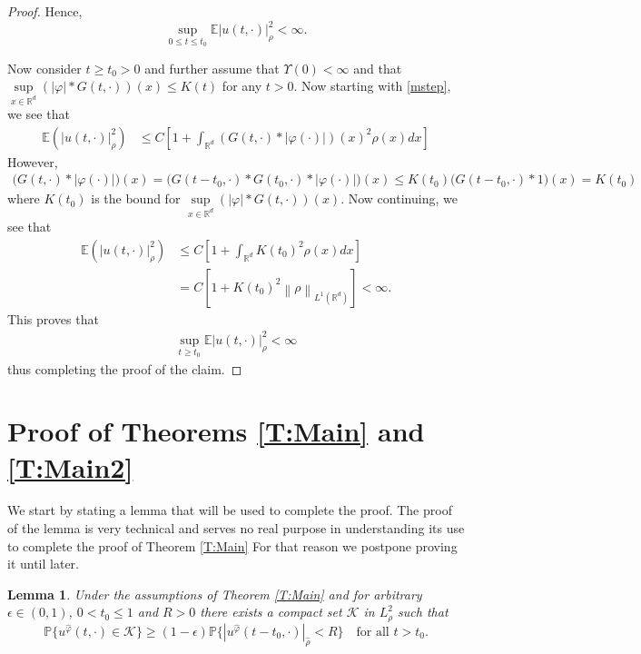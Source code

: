 \documentclass[a4paper,11pt]{article}%
\numberwithin{equation}{section}
\theoremstyle{plain}
\newtheorem{lemma}[theorem]{Lemma}
\theoremstyle{definition}
\newcommand{\R}{\mathbb{R}}
\newcommand{\E}{\mathbb{E}}
\newcommand{\Norm}[1]{\left\|  #1   \right\|}
\begin{document}
\begin{proof}
	Hence,
	\[
	\sup_{0 \le t \le t_0}\E |u(t,\cdot)|_\rho^2 < \infty.
	\]

	Now consider $t\ge t_0>0$ and further assume that $\Upsilon(0) < \infty$ and that $\sup\limits_{x\in \R^d}(|\varphi|*G(t,\cdot))(x) \le K(t)$ for any $t>0$. Now starting with \eqref{mstep}, we see that
	\begin{align*}
		\E\left(| u(t,\cdot)|_\rho^2\right)
		& \le  C\left[1+\int_{\R^d}(G(t,\cdot)*|\varphi(\cdot)|)(x)^2\rho(x)dx\right]
	\end{align*}
	However,
	\begin{align*}
		\big(G(t,\cdot)*|\varphi(\cdot)|\big)(x) = \big(G(t-t_0,\cdot)*G(t_0,\cdot)*|\varphi(\cdot)|\big)(x) \le K(t_0) \big(G(t-t_0,\cdot)*1\big)(x) = K(t_0)
	\end{align*}
	where $K(t_0)$ is the bound for $\sup\limits_{x\in \R^d}(|\varphi|*G(t,\cdot))(x)$. Now continuing, we see that
	\begin{align*}
		\E\left(| u(t,\cdot)|_\rho^2\right)& \le  C\left[1+\int_{\R^d}K(t_0)^2\rho(x)dx\right]
																		\\ & = C \left[ 1+ K(t_0)^2\Norm{\rho}_{L^1(\R^d)}  \right] < \infty.
	\end{align*}
	This proves that
	\begin{align*}
		\sup_{t \ge t_0}\E |u(t,\cdot)|_\rho^2 < \infty
	\end{align*}
	thus completing the proof of the claim.
\end{proof}

\section{Proof of Theorems \ref{T:Main} and \ref{T:Main2}}

	We start by stating a lemma that will be used to complete the proof.
The proof of the lemma is very technical and serves no real purpose in understanding its use to complete
the proof of Theorem \ref{T:Main} For that reason we postpone proving it until later.

\begin{lemma}
	\label{L:Main}
	Under the assumptions of Theorem \ref{T:Main} and for arbitrary $\epsilon \in (0,1)$, $0< t_0 \le 1$ and $R>0$ there exists a compact set $\mathscr K$ in $L^2_{ \rho}$ such that
	\begin{equation}
	\label{E:cpt}
	\mathbb{P}\{u^{\hat{\varphi}}(t,\cdot) \in \mathscr K \} \ge (1-\epsilon)\mathbb{P}\{|u^{
		\hat{\varphi}}(t-t_0,\cdot)|_{\widehat{\rho}} < R\} \quad \text{for all $t>t_0$}.
	\end{equation}
\end{lemma}
\end{document}
